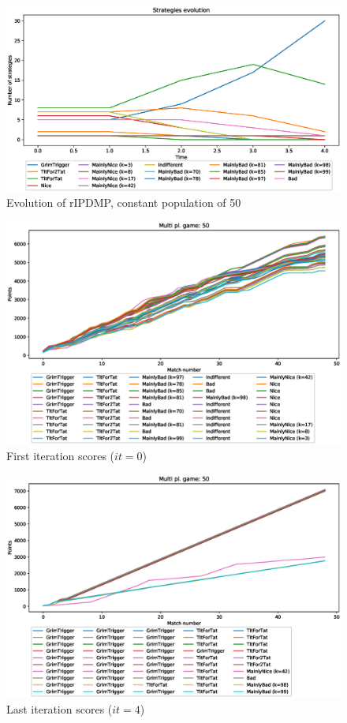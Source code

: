 \documentclass[journal,10pt,twoside]{IEEEtran}
\begin{document}
\begin{figure}[!ht]
    \centering
    \includegraphics[width=1\columnwidth]{../img/ripdmp-const/ripdmp-evolution-const-pop-50}
    \caption{Evolution of rIPDMP, constant population of 50}
    \label{fig:constR}
\end{figure}

\begin{figure}[!ht]
    \centering
    \includegraphics[width=1\columnwidth]{../img/ripdmp-const/ripdmp-scores-const-pop-50-r0}
    \caption{First iteration scores ($it=0$)}
    \label{fig:constFI}
\end{figure}

\begin{figure}[!ht]
    \centering
    \includegraphics[width=1\columnwidth]{../img/ripdmp-const/ripdmp-scores-const-pop-50-r3}
    \caption{Last iteration scores ($it=4$)}
    \label{fig:constLI}
\end{figure}
\end{document}
